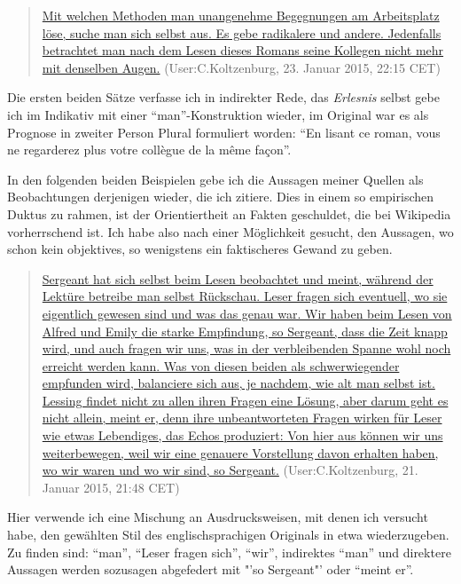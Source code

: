 \documentclass[fontsize=12pt]{scrartcl}
\begin{document}
\singlespacing 
\begin{quote}
\href{https://de.wikipedia.org/w/index.php?title=La_Vie_commune\&oldid=138094789\#Leseerlebnis}{Mit welchen Methoden man unangenehme Begegnungen am Arbeitsplatz l\"ose, suche man sich \mbox{selbst} aus. Es gebe radikalere und andere. Jedenfalls betrachtet man nach dem Lesen dieses Romans seine Kollegen nicht mehr mit denselben Augen.} (User:C.Koltzenburg, 23. Januar 2015, 22:15 CET)
\end{quote}
\onehalfspacing

Die ersten beiden S\"atze verfasse ich in indirekter Rede, das \textit{Erlesnis} \mbox{selbst} gebe ich im Indikativ mit einer "`man"'-Konstruktion wieder, im Original war es als Prognose in zweiter Person Plural formuliert worden: "`En lisant ce roman, vous ne regarderez plus votre coll\`{e}gue de la m\^{e}me fa\c{c}on"'.

In den folgenden beiden Beispielen gebe ich die Aussagen meiner Quellen als Beobachtungen derjenigen wieder, die ich zitiere. Dies in einem so empirischen Duktus zu rahmen, ist der Orientiertheit an Fakten geschuldet, die bei Wi\-ki\-pe\-dia vor\-herr\-schend ist. Ich habe also nach einer M\"oglichkeit gesucht, den Aussagen, wo schon kein objektives, so wenigstens ein faktischeres Gewand zu geben.

\singlespacing 
\begin{quote}
\href{https://de.wikipedia.org/w/index.php?title=Alfred_und_Emily&oldid=138028858#Leseerlebnis}{Sergeant hat sich \mbox{selbst} beim Lesen beobachtet und meint, w\"ahrend der Lekt\"ure betreibe man \mbox{selbst} R\"uckschau. Leser fragen sich eventuell, wo sie eigentlich gewesen sind und was das genau war. Wir haben beim Lesen von Alfred und Emily die starke Empfindung, so Sergeant, dass die Zeit knapp wird, und auch fragen wir uns, was in der verbleibenden Spanne wohl noch erreicht werden kann. Was von diesen beiden als schwerwiegender empfunden wird, balanciere sich aus, je nachdem, wie alt man \mbox{selbst} ist. Lessing findet nicht zu allen ihren Fragen eine L\"osung, aber darum geht es nicht allein, meint er, denn ihre unbeantworteten Fragen wirken f\"ur Leser wie etwas Lebendiges, das Echos produziert: Von \mbox{hier} aus k\"onnen wir uns weiterbewegen, weil wir eine genauere Vorstellung davon erhalten haben, wo wir waren und wo wir sind, so Sergeant.} (User:C.Koltzenburg, 21. Januar 2015, 21:48 CET)
\end{quote}
\onehalfspacing

Hier verwende ich eine Mischung an Ausdrucksweisen, mit denen ich versucht habe, den gew\"ahlten Stil des eng\-lischspra\-chi\-gen Originals in etwa wiederzugeben. Zu fin\-den sind: "`man"', "`Leser fragen sich"', "`wir"', indirektes "`man"' und direktere Aussagen werden sozusagen abgefedert mit "'so Sergeant"' oder "`meint er"'. 
\end{document}
